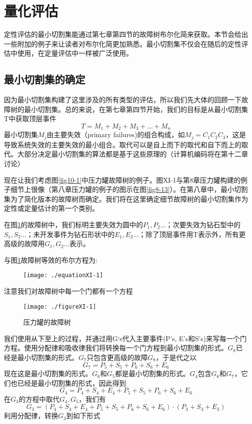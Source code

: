 \documentclass[cn,11pt,chinese]{elegantbook}
\begin{document}
{\section{量化评估}

定性评估的最小切割集能通过第七章第四节的故障树布尔化简来获取。本节会给出一些附加的例子来让读者对布尔化简更加熟悉。最小切割集不仅会在随后的定性评估中使用，在定量评估中一样被广泛使用。

\subsection{最小切割集的确定}

因为最小切割集构建了这里涉及的所有类型的评估，所以我们先大体的回顾一下故障树的最小切割集。总的来说，在第七章第四节开始，我们的目标是从最小切割集T中获取顶层事件
$$T=M_1+M_2+M_3+...+M_n$$
最小切割集$M_j$由主要失效（primary failures)的组合构成，如$M_j=C_1 C_2 C_3$，这是导致系统失效的主要失效的最小组合。取代可以是自上而下的取代和自下而上的取代。大部分决定最小切割集的算法都是基于这些原理的（计算机编码将在第十二章讨论）

现在让我们考虑图\ref{fig10-1}中压力罐故障树的例子。图XI-1与第8章压力罐构建的例子细节上很像（第八章压力罐的例子的图示在图\ref{fig8-13}）。在第八章中，最小切割集为了简化版本的故障树而确定。我们将在这里确定细节故障树的最小切割集作为定性或定量估计的第一个类别。

在图\ref{fig11-1}的故障树中，我们标明主要失效为圆中的$P_1,P_2...$；次要失效为钻石型中的$S_1,S_2...$；未开发事件为钻石形状中的$E_1,E_2...$；除了顶层事件用T表示外，所有更高级的故障用$G_1,G_2...$表示。

与图\ref{fig11-1}故障树等效的布尔方程为:

\begin{figure}
	\texttt{[image: ./equationXI-1]}
\end{figure}

注意我们对故障树中每一个门都有一个方程

\begin{figure}
	\texttt{[image: ./figureXI-1]}
	\caption{压力罐的故障树}
	\label{fig11-1}
\end{figure}

我们使用从下至上的过程，并通过用G‘s代入主要事件(P's, E's和S's)来写每一个门方程。使用分配律和吸收律我们将转换每一个门方程到最小切割集的形式。$G_8$已经是最小切割集的形式。$G_7$只包含更高级的故障$G_8$，于是代之以
$$G_7= P_5+S_5+P_6+S_6+E_6$$
现在这是最小切割集的形式。$G_6$和$G_5$都是最小切割集的形式。$G_4$包含$G_6$和$G_7$，它们也已经是最小切割集的形式，因此得到
$$G_4=P_4+S_4+E_4+P_5+S_5+P_6+S_6+E_6$$
在$G_3$的方程中取代$G_4,G_5$，我们有
$$G_3=(P_4+S_4+E_4+P_5+S_5+P_6+S_6+E_6)\cdot(P_3+S_3+E_3)$$
利用分配律，转换$G_3$到如下形式

}
\end{document}
